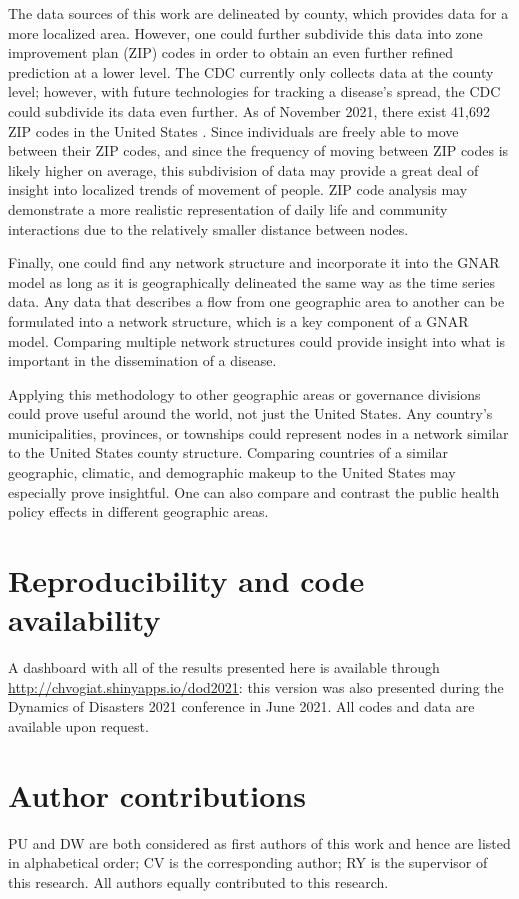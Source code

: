 The data sources of this work are delineated by county, which provides data for a more localized area. However, one could further subdivide this data into zone improvement plan (ZIP) codes in order to obtain an even further refined prediction at a lower level. The {CDC} currently only collects data at the county level; however, with future technologies for tracking a disease's spread, the {CDC} could subdivide its data even further. As of November 2021, there exist 41,692 {ZIP} codes in the United States \cite{USPS:2021}. Since individuals are freely able to move between their {ZIP} codes, and since the frequency of moving between {ZIP} codes is likely higher on average, this subdivision of data may provide a great deal of insight into localized trends of movement of people. {ZIP} code analysis may demonstrate a more realistic representation of daily life and community interactions due to the relatively smaller distance between nodes.

Finally, one could find any network structure and incorporate it into the {GNAR} model as long as it is geographically delineated the same way as the time series data. Any data that describes a flow from one geographic area to another can be formulated into a network structure, which is a key component of a {GNAR} model. Comparing multiple network structures could provide insight into what is important in the dissemination of a disease.

Applying this methodology to other geographic areas or governance divisions could prove useful around the world, not just the United States. Any country's municipalities, provinces, or townships could represent nodes in a network similar to the United States county structure. Comparing countries of a similar geographic, climatic, and demographic makeup to the United States may especially prove insightful. One can also compare and contrast the public health policy effects in different geographic areas.

\section*{Reproducibility and code availability}

A dashboard with all of the results presented here is available through \url{http://chvogiat.shinyapps.io/dod2021}: this version was also presented during the Dynamics of Disasters 2021 conference in June 2021. All codes and data are available upon request.


\section*{Author contributions}
PU and DW are both considered as first authors of this work and hence are listed in alphabetical order; CV is the corresponding author; RY is the supervisor of this research. All authors equally contributed to this research.  
%
